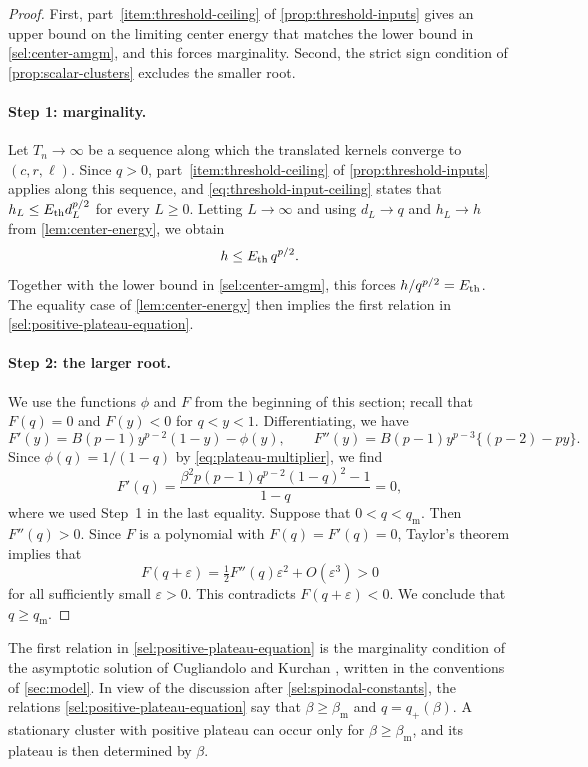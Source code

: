 \begin{proof}
First, part~\ref{item:threshold-ceiling} of \cref{prop:threshold-inputs} gives an upper bound on the limiting center energy that matches the lower bound in \eqref{sel:center-amgm}, and this forces marginality. Second, the strict sign condition of \cref{prop:scalar-clusters} excludes the smaller root.

\paragraph{Step 1: marginality.}
Let $T_n\to\infty$ be a sequence along which the translated kernels converge to $(c,r,\ell)$. Since $q>0$, part~\ref{item:threshold-ceiling} of \cref{prop:threshold-inputs} applies along this sequence, and \eqref{eq:threshold-input-ceiling} states that $h_L\le E_{\mathrm{th}} d_L^{p/2}$ for every $L\ge0$. Letting $L\to\infty$ and using $d_L\to q$ and $h_L\to h$ from \cref{lem:center-energy}, we obtain
\[
 h\le E_{\mathrm{th}}\,q^{p/2}.
\]
Together with the lower bound in \eqref{sel:center-amgm}, this forces $h/q^{p/2}=E_{\mathrm{th}}$. The equality case of \cref{lem:center-energy} then implies the first relation in \eqref{sel:positive-plateau-equation}.

\paragraph{Step 2: the larger root.}
We use the functions $\phi$ and $F$ from the beginning of this section; recall that $F(q)=0$ and $F(y)<0$ for $q<y<1$. Differentiating, we have
\[
 F'(y)=B(p-1)y^{p-2}(1-y)-\phi(y),\qquad
 F''(y)=B(p-1)y^{p-3}\bigl\{(p-2)-py\bigr\}.
\]
Since $\phi(q)=1/(1-q)$ by \eqref{eq:plateau-multiplier}, we find
\[
 F'(q)=\frac{\beta^2p(p-1)q^{p-2}(1-q)^2-1}{1-q}=0,
\]
where we used Step~1 in the last equality. Suppose that $0<q<q_{\mathrm m}$. Then $F''(q)>0$. Since $F$ is a polynomial with $F(q)=F'(q)=0$, Taylor's theorem implies that
\[
 F(q+\varepsilon)=\tfrac12F''(q)\varepsilon^2+O(\varepsilon^3)>0
\]
for all sufficiently small $\varepsilon>0$. This contradicts $F(q+\varepsilon)<0$. We conclude that $q\ge q_{\mathrm m}$.
\end{proof}

The first relation in \eqref{sel:positive-plateau-equation} is the marginality condition of the asymptotic solution of Cugliandolo and Kurchan \cite[Equation~(7)]{ck1993}, written in the conventions of \cref{sec:model}. In view of the discussion after \eqref{sel:spinodal-constants}, the relations \eqref{sel:positive-plateau-equation} say that $\beta\ge\beta_{\mathrm m}$ and $q=q_+(\beta)$. A stationary cluster with positive plateau can occur only for $\beta\ge\beta_{\mathrm m}$, and its plateau is then determined by $\beta$.


